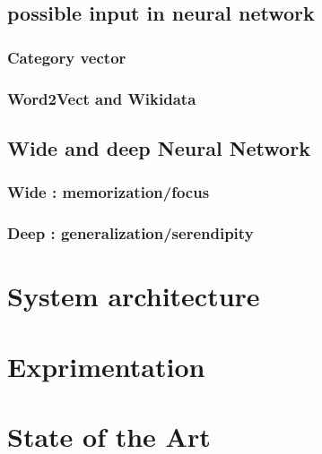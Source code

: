 \documentclass[11pt]{article}
\theoremstyle{plain}
\theoremstyle{definition}
\theoremstyle{remark}
\begin{document}
\subsection{possible input in neural network}
\subsubsection{Category vector}
\subsubsection{Word2Vect and Wikidata}

\subsection{Wide and deep Neural Network}
\subsubsection{Wide : memorization/focus}
\subsubsection{Deep : generalization/serendipity}

\section{System architecture}


\section{Exprimentation}


\section{State of the Art}






\end{document}
